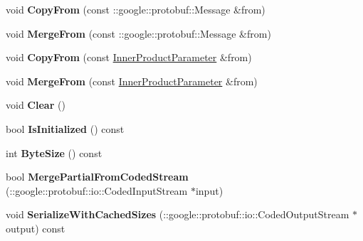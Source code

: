 \begin{DoxyCompactItemize}
void {\bfseries Copy\+From} (const \+::google\+::protobuf\+::\+Message \&from)
\item 
\mbox{\label{classcaffe_1_1_inner_product_parameter_a1fb4593eaf8e44ae4e1e7d3cf992c40f}} 
void {\bfseries Merge\+From} (const \+::google\+::protobuf\+::\+Message \&from)
\item 
\mbox{\label{classcaffe_1_1_inner_product_parameter_af896b4cfba6f961582b881657101ea8f}} 
void {\bfseries Copy\+From} (const \mbox{\hyperlink{classcaffe_1_1_inner_product_parameter}{Inner\+Product\+Parameter}} \&from)
\item 
\mbox{\label{classcaffe_1_1_inner_product_parameter_a44c5701570fbf9e558d58dfa448b1f19}} 
void {\bfseries Merge\+From} (const \mbox{\hyperlink{classcaffe_1_1_inner_product_parameter}{Inner\+Product\+Parameter}} \&from)
\item 
\mbox{\label{classcaffe_1_1_inner_product_parameter_ac2196357abec178f3404e8b6c33b8a43}} 
void {\bfseries Clear} ()
\item 
\mbox{\label{classcaffe_1_1_inner_product_parameter_a2acfff83fe9e48da459b38a70bf8a5fa}} 
bool {\bfseries Is\+Initialized} () const
\item 
\mbox{\label{classcaffe_1_1_inner_product_parameter_a8560b9697ec4114511f7e4db2d3c6ca9}} 
int {\bfseries Byte\+Size} () const
\item 
\mbox{\label{classcaffe_1_1_inner_product_parameter_afad5b54b1115364042aa6a7daa2ca514}} 
bool {\bfseries Merge\+Partial\+From\+Coded\+Stream} (\+::google\+::protobuf\+::io\+::\+Coded\+Input\+Stream $\ast$input)
\item 
\mbox{\label{classcaffe_1_1_inner_product_parameter_a802b3e4bd086b702d14e7fb6fdc1471e}} 
void {\bfseries Serialize\+With\+Cached\+Sizes} (\+::google\+::protobuf\+::io\+::\+Coded\+Output\+Stream $\ast$output) const
\item 
\mbox{\label{classcaffe_1_1_inner_product_parameter_a0f3d6ab696b1dd284fe84942f6cfd924}} 

\end{DoxyCompactItemize}
